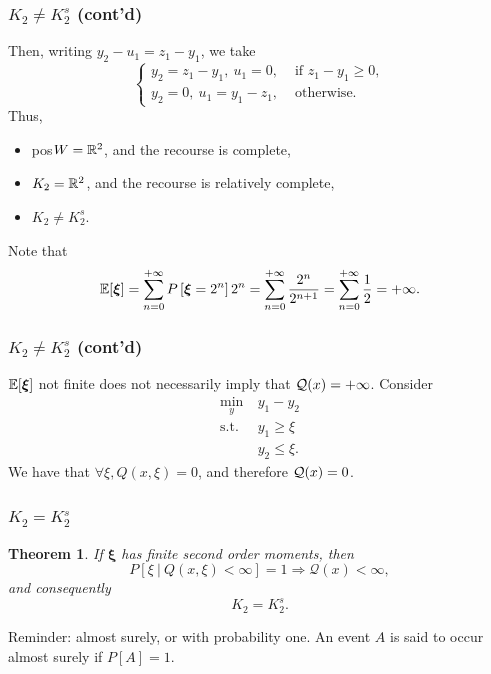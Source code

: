 \documentclass{beamer}
\newtheorem{theo}{Theorem}
\def\bxi{\boldsymbol\xi}
\def\bxi{\boldsymbol\xi}
\begin{document}
\begin{frame}
\frametitle{$K_2 \ne K_2^s$ (cont'd)}

Then, writing $y_2 - u_1 = z_1 - y_1$, we take
$$
\begin{cases}
	y_2 = z_1 - y_1,\ u_1 = 0, & \text{ if } z_1 - y_1 \geq 0,\\
	y_2 = 0,\ u_1 = y_1 - z_1, & \text{ otherwise}.
\end{cases}
$$
Thus,
\begin{itemize}
	\item 
	pos$W = {\mathbb{R}}^2$, and the recourse is complete,
	\item
	$K_2 = {\mathbb{R}}^2$, and the recourse is relatively complete,
	\item
	{\red $K_2 \ne K_2^s$}.
\end{itemize}

\mbox{}

Note that
$$
\EE[\bxi] = \sum_{n=0}^{+\infty} P\left[ \bxi = 2^n \right] 2^n = \sum_{n=0}^{+\infty} \frac{2^n}{2^{n+1}} = \sum_{n=0}^{+\infty} \frac{1}{2} = +\infty.
$$

\end{frame}

\begin{frame}
\frametitle{$K_2 \ne K_2^s$ (cont'd)}

$\EE[\bxi]$ not finite does not necessarily imply that ${\mathcal{Q}}(x) = +\infty$. Consider
\begin{align*}
\min_y \ & y_1 - y_2 \\
\text{s.t. } & y_1 \geq \xi \\
& y_2 \leq \xi.
\end{align*}
We have that $\forall \xi, Q(x, \xi) = 0$, and therefore ${\mathcal{Q}}(x) = 0$.

\end{frame}

\begin{frame}
\frametitle{$K_2 = K_2^s$}

\begin{theo}
If $\bxi$ has finite second order moments, then
$$
P[ \xi \ |\ Q(x,\xi) < \infty] = 1 \Longrightarrow \mathcal{Q}(x) < \infty,
$$
and consequently
$$
K_2 = K_2^s.
$$
\end{theo}


\mbox{}

Reminder: almost surely, or with probability one. An event $A$ is said to occur almost surely if $P[A] = 1$.

\end{frame}
\end{document}
